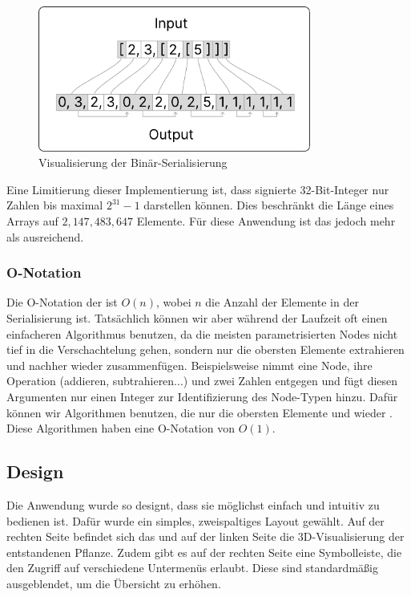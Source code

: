 \documentclass[ngerman]{article}
\begin{document}
\begin{figure}[htbp]
  \centering
  \includegraphics[width=0.8\textwidth]{./graphics/ENCODING_SCHEME.pdf}
  \caption{Visualisierung der Binär-Serialisierung}
  \label{fig:encoding_scheme}
\end{figure}

Eine Limitierung dieser Implementierung ist, dass signierte 32-Bit-Integer nur Zahlen bis maximal $2^{31}-1$ darstellen können. Dies beschränkt die Länge eines Arrays auf $2,147,483,647$ Elemente. Für diese Anwendung ist das jedoch mehr als ausreichend.

\subsubsection*{O-Notation}
Die O-Notation der  ist $O(n)$, wobei $n$ die Anzahl der Elemente in der Serialisierung ist. Tatsächlich können wir aber während der Laufzeit oft einen einfacheren Algorithmus benutzen, da die meisten parametrisierten Nodes nicht tief in die Verschachtelung gehen, sondern nur die obersten Elemente extrahieren und nachher wieder zusammenfügen. 
\br
Beispielsweise nimmt eine  Node, ihre Operation (addieren, subtrahieren...) und zwei Zahlen entgegen und fügt diesen Argumenten nur einen Integer zur Identifizierung des Node-Typen hinzu. Dafür können wir Algorithmen benutzen, die nur die obersten Elemente  und wieder .  Diese Algorithmen haben eine O-Notation von $O(1)$.

\pagebreak

\subsection{Design}

Die Anwendung wurde so designt, dass sie möglichst einfach und intuitiv zu bedienen ist. Dafür wurde ein simples, zweispaltiges Layout gewählt. Auf der rechten Seite befindet sich das  und auf der linken Seite die 3D-Visualisierung der entstandenen Pflanze. Zudem gibt es auf der rechten Seite eine Symbolleiste, die den Zugriff auf verschiedene Untermenüs erlaubt. Diese sind standardmäßig ausgeblendet, um die Übersicht zu erhöhen.
\end{document}
